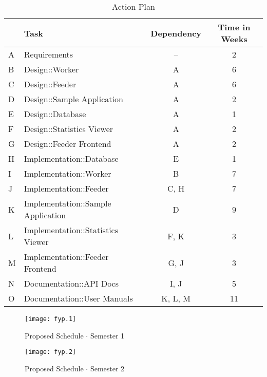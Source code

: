 \begin{table}[H]
\begin{tabularx}{\linewidth}{llcc}
\toprule
\textbf{} & \textbf{Task} & \textbf{Dependency} & \textbf{Time in Weeks} \\
\midrule
\endhead
A & Requirements                       & --      & 2  \\
B & Design::Worker                     & A       & 6  \\
C & Design::Feeder                     & A       & 6  \\
D & Design::Sample Application         & A       & 2  \\
E & Design::Database                   & A       & 1  \\
F & Design::Statistics Viewer          & A       & 2  \\
G & Design::Feeder Frontend            & A       & 2  \\
H & Implementation::Database           & E       & 1  \\
I & Implementation::Worker             & B       & 7  \\
J & Implementation::Feeder             & C, H    & 7  \\
K & Implementation::Sample Application & D       & 9  \\
L & Implementation::Statistics Viewer  & F, K    & 3  \\
M & Implementation::Feeder Frontend    & G, J    & 3  \\
N & Documentation::API Docs            & I, J    & 5  \\
O & Documentation::User Manuals        & K, L, M & 11 \\
\bottomrule
\end{tabularx}
\caption{Action Plan}
\label{tab:actionplan}
\end{table}

\begin{figure}[H]
\begin{flushleft}
\texttt{[image: fyp.1]}
\end{flushleft}
\caption{Proposed Schedule $\cdot$ Semester 1}
\label{fig:gantt1}
\end{figure}

\begin{figure}[H]
\begin{flushleft}
\texttt{[image: fyp.2]}
\end{flushleft}
\caption{Proposed Schedule $\cdot$ Semester 2}
\label{fig:gantt2}
\end{figure}

